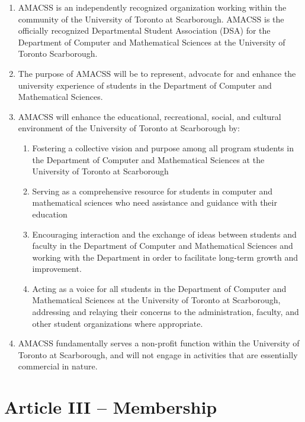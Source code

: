\documentclass[12pt,a4paper]{article}
\begin{document}
\begin{enumerate}
\item AMACSS is an independently recognized organization working within the community of the University of Toronto at Scarborough. AMACSS is the officially recognized Departmental Student Association (DSA) for the Department of Computer and Mathematical Sciences at the University of Toronto Scarborough.

\item The purpose of AMACSS will be to represent, advocate for and enhance the university experience of students in the Department of Computer and Mathematical Sciences.

\item AMACSS will enhance the educational, recreational, social, and cultural environment of the University of Toronto at Scarborough by:

\begin{enumerate}
\item Fostering a collective vision and purpose among all program students in the Department of Computer and Mathematical Sciences at the University of Toronto at Scarborough

\item Serving as a comprehensive resource for students in computer and mathematical sciences who need assistance and guidance with their education

\item Encouraging interaction and the exchange of ideas between students and faculty in the Department of Computer and Mathematical Sciences and working with the Department in order to facilitate long-term growth and improvement.

\item Acting as a voice for all students in the Department of Computer and Mathematical Sciences at the University of Toronto at Scarborough, addressing and relaying their concerns to the administration, faculty, and other student organizations where appropriate.
\end{enumerate}

\item AMACSS fundamentally serves a non-profit function within the University of Toronto at Scarborough, and will not engage in activities that are essentially commercial in nature.
\end{enumerate}

\section*{Article III – Membership}
\end{document}

